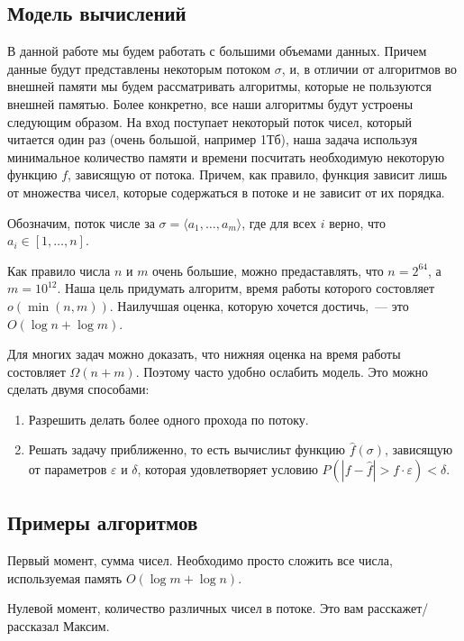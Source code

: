 \documentclass{article}
\newcommand{\abs}[1]{\left| #1 \right|}
\renewcommand{\epsilon}{\varepsilon}
\begin{document}
\subsection{Модель вычислений}
В данной работе мы будем работать с большими объемами данных.
Причем данные будут представлены некоторым потоком $\sigma$, и,
в отличии от алгоритмов во внешней памяти мы будем рассматривать
алгоритмы, которые не пользуются внешней памятью.
Более конкретно, все наши алгоритмы будут устроены следующим образом.
На вход поступает некоторый поток чисел, который читается один раз
(очень большой, например 1Тб), наша задача
используя минимальное количество памяти и времени посчитать необходимую некоторую функцию $f$,
зависящую  от потока. Причем, как правило, функция зависит лишь от множества чисел, которые
содержаться в потоке и не зависит от их порядка.

Обозначим, поток числе за $\sigma = \langle a_1, \ldots, a_m \rangle$, где для всех $i$
верно, что $a_i \in [1, \ldots, n]$.

Как правило числа $n$ и $m$ очень большие, можно предаставлять, что $n = 2^{64}$, а $m = 10^{12}$.
Наша цель придумать алгоритм, время работы которого состовляет $o\left(\min(n, m)\right)$.
Наилучшая оценка, которую хочется достичь,~--- это $O(\log n + \log m)$.

Для многих задач можно доказать, что нижняя оценка на время работы состовляет $\Omega(n + m)$.
Поэтому часто удобно ослабить модель. Это можно сделать двумя способами:
\begin{enumerate}
\item
Разрешить делать более одного прохода по потоку.

\item
Решать задачу приближенно, то есть вычислиьт функцию $\hat{f}(\sigma)$,
зависящую от параметров $\epsilon$ и $\delta$,
которая удовлетворяет условию $P \left( \abs{f - \hat{f}}  > f \cdot \epsilon \right) < \delta$.
\end{enumerate}




\subsection{Примеры алгоритмов}

Первый момент, сумма чисел. Необходимо просто сложить все числа, используемая память $O(\log m + \log n)$.

Нулевой момент, количество различных чисел в потоке. Это вам расскажет/рассказал Максим.
\end{document}

